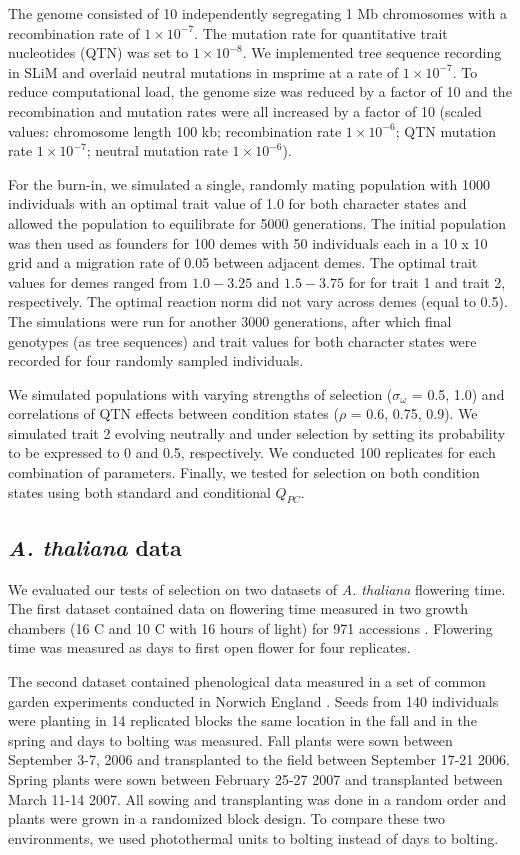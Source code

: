 \documentclass[11pt,letterpaper]{article}
\begin{document}
The genome consisted of 10 independently segregating 1 Mb chromosomes with a recombination rate of $1\times10^{-7}$. 
The mutation rate for quantitative trait nucleotides (QTN) was set to $1\times10^{-8}$. 
We implemented tree sequence recording in SLiM and overlaid neutral mutations in msprime \citep{msprime} at a rate of $1\times10^{-7}$. To reduce computational load, the genome size was reduced by a factor of 10 and the recombination and mutation rates were all increased by a factor of 10 (scaled values: chromosome length 100 kb; recombination rate $1\times10^{-6}$; QTN mutation rate $1\times10^{-7}$; neutral mutation rate $1\times10^{-6}$).

For the burn-in, we simulated a single, randomly mating population with 1000 individuals with an optimal trait value of 1.0 for both character states and allowed the population to equilibrate for 5000 generations. The initial population was then used as founders for 100 demes with 50 individuals each in a 10 x 10 grid and a migration rate of 0.05 between adjacent demes. The optimal trait values for demes ranged from $1.0-3.25$ and $1.5-3.75$ for for trait 1 and trait 2, respectively. The optimal reaction norm did not vary across demes (equal to 0.5). The simulations were run for another 3000 generations, after which final genotypes (as tree sequences) and trait values for both character states were recorded for four randomly sampled individuals.

We simulated populations with varying strengths of selection ($\sigma_\omega$ = 0.5, 1.0) and correlations of QTN effects between condition states ($\rho$ = 0.6, 0.75, 0.9). We simulated trait 2 evolving neutrally and under selection by setting its probability to be expressed to 0 and 0.5, respectively. We conducted 100 replicates for each combination of parameters. Finally, we tested for selection on both condition states using both standard and conditional $Q_{PC}$.

\subsection*{\textit{A. thaliana} data}
We evaluated our tests of selection on two datasets of \textit{A. thaliana} flowering time.
The first dataset contained data on flowering time measured in two growth chambers (16 \degree C and 10 \degree C with 16 hours of light) for 971 accessions \citep{alonso20161}.
Flowering time was measured as days to first open flower for four replicates.

The second dataset contained phenological data measured in a set of common garden experiments conducted in Norwich England \citep{fournier2011map, wilczek2009effects}. 
Seeds from 140 individuals were planting in 14 replicated blocks the same location in the fall  and in the spring and days to bolting was measured.
Fall plants were sown between September 3-7, 2006 and transplanted to the field between September 17-21 2006.
Spring plants were sown between February 25-27 2007 and transplanted between March 11-14 2007.
All sowing and transplanting was done in a random order and plants were grown in a randomized block design.
To compare these two environments, we used photothermal units to bolting instead of days to bolting.
\end{document}
